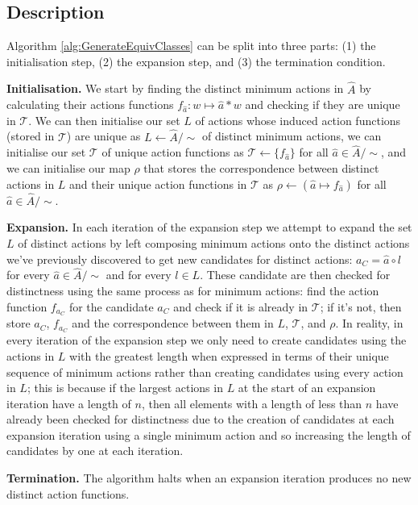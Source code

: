 \subsection{Description}
Algorithm \ref{alg:GenerateEquivClasses} can be split into three parts: (1) the initialisation step, (2) the expansion step, and (3) the termination condition.

\textbf{Initialisation.}
We start by finding the distinct minimum actions in $\hat{A}$ by calculating their actions functions $f_{\hat{a}}: w \mapsto \hat{a} \ast w$ and checking if they are unique in $\mathcal{T}$.
We can then initialise our set $L$ of actions whose induced action functions (stored in $\mathcal{T}$) are unique as $L \gets \hat{A}/\sim$ of distinct minimum actions, we can initialise our set $\mathcal{T}$ of unique action functions as $\mathcal{T}\gets \{f_{\hat{a}}\}$ for all $\hat{a} \in \hat{A}/\sim$, and we can initialise our map $\rho$ that stores the correspondence between distinct actions in $L$ and their unique action functions in $\mathcal{T}$ as $\rho \gets (\hat{a} \mapsto f_{\hat{a}})$ for all $\hat{a} \in \hat{A}/\sim$.

\textbf{Expansion.}
In each iteration of the expansion step we attempt to expand the set $L$ of distinct actions by left composing minimum actions onto the distinct actions we've previously discovered to get new candidates for distinct actions: $a_{C} = \hat{a} \circ l$ for every $\hat{a} \in \hat{A}/\sim$ and for every $l \in L$.
These candidate are then checked for distinctness using the same process as for minimum actions: find the action function $f_{a_{C}}$ for the candidate $a_{C}$ and check if it is already in $\mathcal{T}$; if it's not, then store $a_{C}$, $f_{a_{C}}$ and the correspondence between them in $L$, $\mathcal{T}$, and $\rho$.
In reality, in every iteration of the expansion step we only need to create candidates using the actions in $L$ with the greatest length when expressed in terms of their unique sequence of minimum actions rather than creating candidates using every action in $L$; this is because if the largest actions in $L$ at the start of an expansion iteration have a length of $n$, then all elements with a length of less than $n$ have already been checked for distinctness due to the creation of candidates at each expansion iteration using a single minimum action and so increasing the length of candidates by one at each iteration.

\textbf{Termination.}
The algorithm halts when an expansion iteration produces no new distinct action functions.

